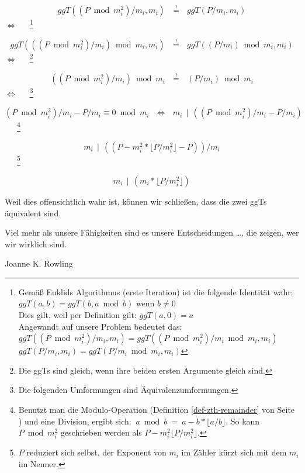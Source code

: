 \begin{refsegment}
$$ggT((P \bmod {m_{i}^{2}})/ m_{i}, m_{i})~~~  \overset{!}{=}  ~~~ggT( P / m_{i}, m_{i})$$
$ \Longleftrightarrow $~~~\footnote{Gemäß Euklids Algorithmus (erste Iteration) ist die folgende Identität wahr:\\
$ggT(a, b) = ggT(b, a \bmod b)$ wenn $ b \neq 0 $\\
Dies gilt, weil per Definition gilt: $ggT(a, 0) = a$\\
Angewandt auf unsere Problem bedeutet das:
\mbox{}\\
$ggT((P \bmod {m_{i}^{2}})/ m_{i}, m_{i})=ggT((P \bmod {m_{i}^{2}})/ m_{i} \bmod{m_{i}}, m_{i})$ \mbox{}\\
$ggT( P / m_{i}, m_{i})=ggT( P / m_{i} \bmod{m_{i}}, m_{i})$\mbox{}
}

$$ggT(((P \bmod {m_{i}^{2}})/ m_{i}) \bmod {m_{i}}, m_{i})~~~  \overset{!}{=}  ~~~ggT( (P / m_{i}) \bmod {m_{i}}, m_{i})$$
$ \Longleftrightarrow $~~~\footnote{Die ggTs sind gleich, wenn ihre beiden ersten Argumente gleich sind.
}

$$((P \bmod {m_{i}^{2}})/ m_{i}) \bmod {m_{i}}~~~  \overset{!}{=}  ~~~ (P / m_{i}) \bmod {m_{i}}$$
$ \Longleftrightarrow $~~~\footnote{Die folgenden Umformungen sind Äquivalenzumformungen.
}

$$(P \bmod{m_{i}^{2}})/ m_{i} - P / m_{i} \equiv 0   \bmod{m_{i}}~~~ \Leftrightarrow ~~~  m_{i} ~~ | ~~ ((P \bmod{m_{i}^{2}})/ m_{i} - P / m_{i})$$~~~\footnote{%
Benutzt man die Modulo-Operation (Definition \ref{def-zth-remainder} von Seite
\pageref{def-zth-remainder}) und eine Division, ergibt sich:
$~a \bmod{b} ~ =  ~ a - b * \lfloor a/b \rfloor$. So kann $P \bmod{m_{i}^{2}}$ geschrieben werden als $ P-m_{i}^{2} \lfloor P/m_{i}^{2} \rfloor$.
}

$$ m_{i} ~~ | ~~ ((P-m_{i}^{2}* \lfloor P/m_{i}^{2} \rfloor - P))/m_{i}$$~~~\footnote{%
$P$ reduziert sich selbst, der Exponent von $m_{i}$ im Zähler kürzt sich mit dem $m_{i}$ im Nenner.
}

$$ m_{i} ~~ | ~~ (m_{i}* \lfloor P/m_{i}^{2} \rfloor)$$

Weil dies offensichtlich wahr ist, können wir schließen, dass die zwei ggTs äquivalent sind.




\newpage
\begin{ctsquote}
Viel mehr als unsere Fähigkeiten sind es
unsere Entscheidungen \dots, die zeigen, wer wir wirklich sind.
\caption[Joanne K. Rowling]{Joanne K. Rowling\footnotemark}
\end{ctsquote}


\end{refsegment}
